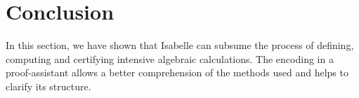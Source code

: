 \documentclass[runningheads]{llncs}
\begin{document}
\section{Conclusion}

In this section, we have shown that Isabelle can subsume the process of defining, computing and certifying intensive algebraic calculations. The encoding in a proof-assistant allows a better comprehension of the methods used and helps to clarify its structure.
%
%
%
% 
% 
\printbibliography
%
\end{document}
